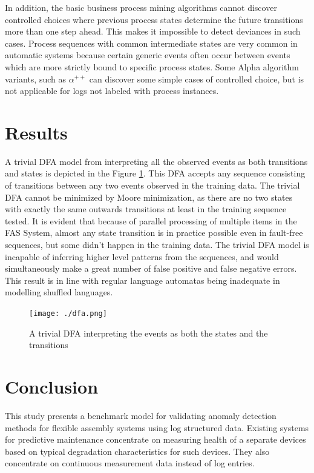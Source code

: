 \documentclass[journal]{IEEEtran}
\begin{document}
In addition, the basic business process mining algorithms cannot discover controlled choices where previous process states
determine the future transitions more than one step ahead. This makes it impossible to detect deviances in such cases. Process sequences with common intermediate states
are very common in automatic systems because certain generic events often occur between events which are more strictly bound to specific process states. Some Alpha algorithm
variants, such as $\alpha^{++}$ \cite{wen2007mining} can discover some simple cases of controlled choice, but is not applicable for logs not labeled with process instances.

\section{Results}

A trivial DFA model from interpreting all the observed events as both transitions and states is depicted in the Figure \ref{figure:trivial_DFA}.
This DFA accepts any sequence consisting of transitions between any two events observed in the training data. The trivial DFA cannot be minimized by Moore minimization,
as there are no two states with exactly the same outwards transitions at least in the training sequence tested.
It is evident that because of parallel processing of multiple items in the FAS System, almost any state transition is
in practice possible even in fault-free sequences, but some didn't happen in the training data.
The trivial DFA model is incapable of inferring higher level patterns from the sequences, and would simultaneously make a great number of false positive
and false negative errors. This result is in line with regular language automatas being inadequate in modelling shuffled languages.
\begin{figure}[tb]
 \centering
 \texttt{[image: ./dfa.png]}
 \caption{A trivial DFA interpreting the events as both the states and the transitions}
 \label{figure:trivial_DFA}
\end{figure}

\section{Conclusion}

This study presents a benchmark model for validating anomaly detection methods for flexible assembly systems using log structured data.
Existing systems for predictive maintenance concentrate on measuring health of a separate devices based on typical degradation characteristics
for such devices. They also concentrate on continuous measurement data instead of log entries.
\end{document}
